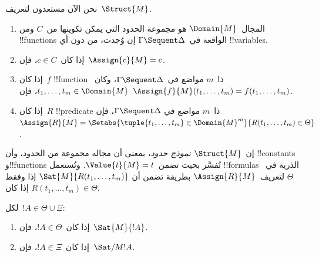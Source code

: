 \documentclass[../../../include/open-logic-section]{subfiles}
\begin{document}
نحن الآن مستعدون لتعريف~$\Struct{M}$.
\begin{enumerate}
\item المجال~$\Domain{M}$ هو مجموعة الحدود التي يمكن تكوينها من~$C$ ومن
!!{function}s الواقعة في~$\Gamma \Sequent \Delta$ إن وُجدت، من دون أي
!!{variable}s.
\item إذا كان~$c\in C$، فإن~$\Assign{c}{M}=c$.
\item إذا كان~$f$ !!{function} ذا~$m$ مواضع في~$\Gamma \Sequent \Delta$،
وكان~$t_1,\dots,t_m\in\Domain{M}$، فإن
$\Assign{f}{M}(t_1,\dots,t_m)=f(t_1,\dots,t_m)$.
\item إذا كان~$R$ !!{predicate} ذا~$m$ مواضع في
$\Gamma \Sequent \Delta$، فإن
$\Assign{R}{M}=\Setabs{\tuple{t_1,\dots,t_m}\in\Domain{M}^m}
{R(t_1,\dots,t_m)\in\Theta}$.
\end{enumerate}
إن~$\Struct{M}$ \emph{نموذج حدود}، بمعنى أن مجاله مجموعة من الحدود، وأن
!!{constant}s و!!{function}s تُفسَّر بحيث تضمن~$\Value{t}{M}=t$. وتُستعمل
!!{formula}s الذرية في~$\Theta$ لتعريف~$\Assign{R}{M}$ بطريقة تضمن أن
$\Sat{M}{R(t_1,\dots,t_m)}$ إذا وفقط إذا كان
$R(t_1,\dots,t_m)\in\Theta$.

\begin{lem}
لكل~$!A\in\Theta\cup\Xi$:
\begin{enumerate}
  \item إذا كان~$!A\in\Theta$، فإن~$\Sat{M}{!A}$.
  \item إذا كان~$!A\in\Xi$، فإن~$\Sat/{M}{!A}$.
\end{enumerate}
\end{lem}
\end{document}
